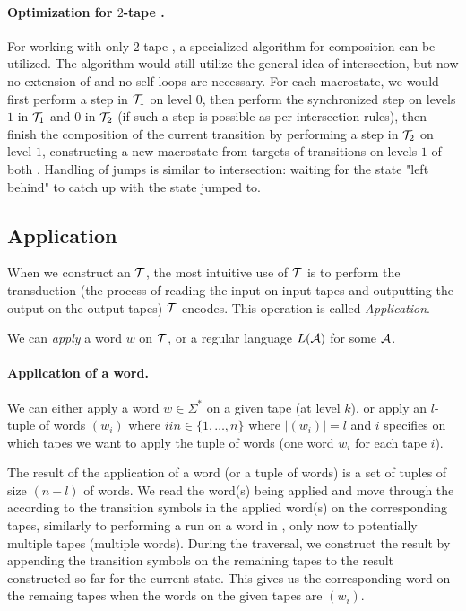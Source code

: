 \paragraph{Optimization for $2$-tape \nfts.}
For working with only $2$-tape \nfts, a specialized algorithm for composition can be utilized.
The algorithm would still utilize the general idea of \nft intersection, but now no extension of \nfts and no self-loops are necessary.
For each macrostate, we would first perform a step in $\mathcal{T}_1$ on level $0$, then perform the synchronized step on levels $1$ in $\mathcal{T}_1$ and $0$ in $\mathcal{T}_2$ (if such a step is possible as per \nft intersection rules), then finish the composition of the current transition by performing a step in $\mathcal{T}_2$ on level $1$, constructing a new macrostate from targets of transitions on levels $1$ of both \nfts.
Handling of jumps is similar to \nft intersection: waiting for the state "left behind" to catch up with the state jumped to.

\subsection{Application}

When we construct an \nft $\mathcal{T}$, the most intuitive use of $\mathcal{T}$ is to perform the transduction (the process of reading the input on input tapes and outputting the output on the output tapes) $\mathcal{T}$ encodes.
This operation is called \emph{Application}.

We can \emph{apply} a word $w$ on $\mathcal{T}$, or a regular language $L(\mathcal{A})$ for some $\mathcal{A}$.

\paragraph{Application of a word.}
We can either apply a word $w \in \Sigma^*$ on a given tape (at level $k$), or apply an $l$-tuple of words $(w_i)$ where $i in \in \{ 1, \ldots, n \}$ where $|(w_i)| = l$ and $i$ specifies on which tapes we want to apply the tuple of words (one word $w_i$ for each tape $i$).

The result of the application of a word (or a tuple of words) is a set of tuples of size $(n - l)$ of words.
We read the word(s) being applied and move through the \nft according to the transition symbols in the applied word(s) on the corresponding tapes, similarly to performing a run on a word in \nfa, only now to potentially multiple tapes (multiple words).
During the traversal, we construct the result by appending the transition symbols on the remaining tapes to the result constructed so far for the current state.
This gives us the corresponding word on the remaing tapes when the words on the given tapes are $(w_i)$.

